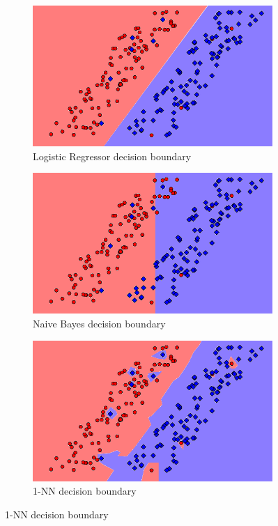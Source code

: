 \documentclass[letterpaper,10pt]{article} %
\begin{document}
\begin{figure}[h]
\centering
\begin{subfigure}[b]{\textwidth}
\includegraphics[width=\textwidth]{handout/q3-1-logistic}
\caption{Logistic Regressor decision boundary}
\label{fig:log1}
\end{subfigure}%

\begin{subfigure}[b]{\textwidth}
\includegraphics[width=\textwidth]{handout/q3-1-bayes}
\caption{Naive Bayes decision boundary}
\label{fig:bayes1}
\end{subfigure}

\begin{subfigure}[b]{\textwidth}
\includegraphics[width=\textwidth]{handout/q3-1-NN}
\caption{1-NN decision boundary}
\label{fig:1nn1}
\end{subfigure}


\end{figure}
\end{document}
